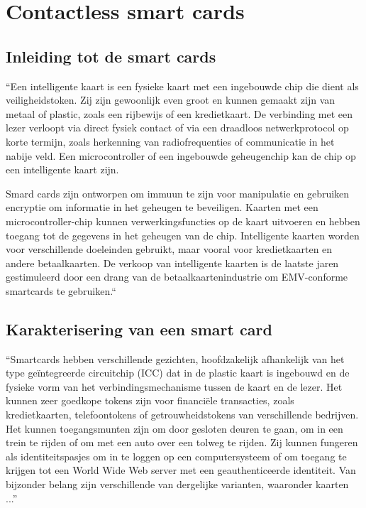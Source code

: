 \section{Contactless smart cards}
\subsection{Inleiding tot de smart cards}
``Een intelligente kaart is een fysieke kaart met een ingebouwde chip die dient als veiligheidstoken. Zij zijn gewoonlijk even groot en kunnen gemaakt zijn van metaal of plastic, zoals een rijbewijs of een kredietkaart. De verbinding met een lezer verloopt via direct fysiek contact of via een draadloos netwerkprotocol op korte termijn, zoals herkenning van radiofrequenties of communicatie in het nabije veld. Een microcontroller of een ingebouwde geheugenchip kan de chip op een intelligente kaart zijn.

Smard cards zijn ontworpen om immuun te zijn voor manipulatie en gebruiken encryptie om informatie in het geheugen te beveiligen. Kaarten met een microcontroller-chip kunnen verwerkingsfuncties op de kaart uitvoeren en hebben toegang tot de gegevens in het geheugen van de chip. Intelligente kaarten worden voor verschillende doeleinden gebruikt, maar vooral voor kredietkaarten en andere betaalkaarten. De verkoop van intelligente kaarten is de laatste jaren gestimuleerd door een drang van de betaalkaartenindustrie om EMV-conforme smartcards te gebruiken.``\autocite{SwatiTawdeSmartCard}

\subsection{Karakterisering van een smart card}
``Smartcards hebben verschillende gezichten, hoofdzakelijk afhankelijk van het type geïntegreerde circuitchip (ICC) dat in de plastic kaart is ingebouwd en de fysieke vorm van het verbindingsmechanisme tussen de kaart en de lezer. Het kunnen zeer goedkope tokens zijn voor financiële transacties, zoals kredietkaarten, telefoontokens of getrouwheidstokens van verschillende bedrijven. Het kunnen toegangsmunten zijn om door gesloten deuren te gaan, om in een trein te rijden of om met een auto over een tolweg te rijden. Zij kunnen fungeren als identiteitspasjes om in te loggen op een computersysteem of om toegang te krijgen tot een World Wide Web server met een geauthenticeerde identiteit. Van bijzonder belang zijn verschillende van dergelijke varianten, waaronder kaarten ...''\autocite{OreillySmartCards}

